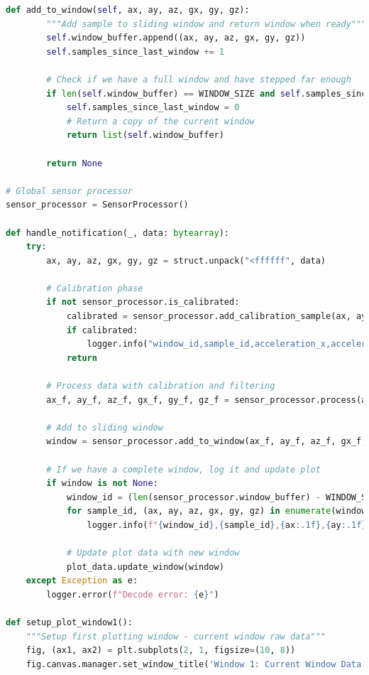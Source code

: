 \documentclass[conference]{IEEEtran}
\begin{document}
\begin{lstlisting}[language=Python]
    def add_to_window(self, ax, ay, az, gx, gy, gz):
        """Add sample to sliding window and return window when ready"""
        self.window_buffer.append((ax, ay, az, gx, gy, gz))
        self.samples_since_last_window += 1
        
        # Check if we have a full window and have stepped far enough
        if len(self.window_buffer) == WINDOW_SIZE and self.samples_since_last_window >= WINDOW_STEP:
            self.samples_since_last_window = 0
            # Return a copy of the current window
            return list(self.window_buffer)
        
        return None

# Global sensor processor
sensor_processor = SensorProcessor()

def handle_notification(_, data: bytearray):
    try:
        ax, ay, az, gx, gy, gz = struct.unpack("<ffffff", data)
        
        # Calibration phase
        if not sensor_processor.is_calibrated:
            calibrated = sensor_processor.add_calibration_sample(ax, ay, az, gx, gy, gz)
            if calibrated:
                logger.info("window_id,sample_id,acceleration_x,acceleration_y,acceleration_z,gyro_x,gyro_y,gyro_z")
            return
        
        # Process data with calibration and filtering
        ax_f, ay_f, az_f, gx_f, gy_f, gz_f = sensor_processor.process(ax, ay, az, gx, gy, gz)
        
        # Add to sliding window
        window = sensor_processor.add_to_window(ax_f, ay_f, az_f, gx_f, gy_f, gz_f)
        
        # If we have a complete window, log it and update plot
        if window is not None:
            window_id = (len(sensor_processor.window_buffer) - WINDOW_SIZE) // WINDOW_STEP + 1
            for sample_id, (ax, ay, az, gx, gy, gz) in enumerate(window):
                logger.info(f"{window_id},{sample_id},{ax:.1f},{ay:.1f},{az:.1f},{gx:.1f},{gy:.1f},{gz:.1f}")
            
            # Update plot data with new window
            plot_data.update_window(window)
    except Exception as e:
        logger.error(f"Decode error: {e}")

def setup_plot_window1():
    """Setup first plotting window - current window raw data"""
    fig, (ax1, ax2) = plt.subplots(2, 1, figsize=(10, 8))
    fig.canvas.manager.set_window_title('Window 1: Current Window Data')
    

\end{lstlisting}
\end{document}
